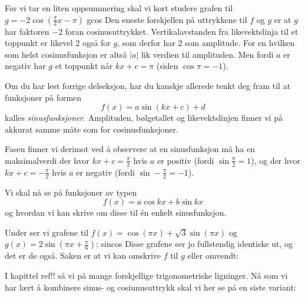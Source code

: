 Før vi tar en liten oppsummering skal vi kort studere grafen til $ g = -2\cos(\frac{\pi}{2}x-\pi) $
{gcos}
Den eneste forskjellen på uttrykkene til $ f $ og $ g $ er at $ g $ har faktoren $ -2 $ foran cosinusuttrykket. Vertikalavstanden fra likevektslinja til et toppunkt er likevel 2 også for $ g $, som derfor har 2 som amplitude. For en hvilken som helst cosinusfunksjon er altså $ |a| $ lik verdien til amplituden. Men fordi $ a $ er negativ har $ g $ et toppunkt når $ kx+c=\pi $ (siden $ \cos \pi=-1 $).
\cosf

Om du har lest forrige delseksjon, har du kanskje allerede tenkt deg fram til at funksjoner på formen
\[ f(x) = a\sin (kx+c)+d\]
kalles \textit{sinusfunksjoner}. Amplituden, bølgetallet og likevektslinjen finner vi på akkurat samme måte som for cosinusfunksjoner. 

Fasen finner vi derimot ved å observere at en sinusfunksjon må ha en maksimalverdi der hvor $ kx+c=\frac{\pi}{2} $ hvis $ a $ er positiv \big(fordi $ \sin \frac{\pi}{2}=1 $\big), og der hvor $ kx+c = -\frac{\pi}{2} $ hvis $ a $ er negativ \big(fordi $ \sin -\frac{\pi}{2}=-1 $\big).

\sinf
\rele

Vi skal nå se på funksjoner av typen
\[ f(x) = a \cos kx + b \sin kx \]
og hvordan vi kan skrive om disse til én enkelt sinusfunksjon.

Under ser vi grafene til $ f(x) = \cos(\pi x) + \sqrt{3}\sin(\pi x)$
og\, $ g(x) = 2 \sin\left(\pi x +\frac{\pi}{6}	\right)$:
{sincos} 
Disse grafene ser jo fullstendig identiske ut, og det er de også. Saken er at vi kan omskrive $ f $ til $ g $ eller omvendt:

\komb
\kombe

I kapittel ref!! så vi på mange forskjellige trigonometriske ligninger. Nå som vi har lært å kombinere sinus- og cosiunusuttrykk skal vi her se på en siste variant:


